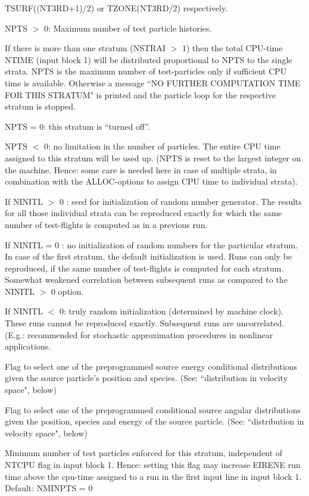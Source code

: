 \begin{list}{ }{}
TSURF((NT3RD+1)/2) or TZONE(NT3RD/2) respectively.
\item[{\bf NPTS
}] NPTS $>$ 0: Maximum number of test particle histories.

If there is more than one stratum (NSTRAI $>$  1) then the total
CPU-time NTIME (input block 1) will be distributed proportional to
NPTS to the single strata. NPTS is the maximum number of
test-particles only if sufficient CPU time is available. Otherwise
a message ``NO FURTHER COMPUTATION TIME FOR THIS STRATUM" is
printed and the particle loop for the respective stratum is
stopped.

NPTS = 0: this stratum is ``turned off''.

NPTS $<$ 0: no limitation in the number of particles. The entire
CPU time assigned to this stratum will be used up. (NPTS is reset
to the largest integer on the machine. Hence: some care is needed
here in case of multiple strata, in combination with the
ALLOC-options to assign CPU time to individual strata).


\item[{\bf NINITL }]
If NINITL $>$ 0 : seed for initialization of random number
generator. The results for all those individual strata can be
reproduced exactly for which the same number of test-flights is
computed as in a previous run.


If NINITL = 0 : no initialization of random numbers for the
particular stratum. In case of the first stratum, the default
initialization is used. Runs can only be reproduced, if the same
number of test-flights is computed for each stratum. Somewhat
weakened correlation between subsequent runs as compared to the
NINITL $>$ 0 option.

If NINITL $<$ 0: truly random initialization (determined by machine
clock). These runs cannot be reproduced exactly. Subsequent runs are
uncorrelated. (E.g.: recommended for stochastic approximation
procedures in nonlinear applications.
\item[{\bf NEMODS }]
Flag to select one of the preprogrammed
source energy conditional distributions
given the source particle's position and
species.
(See: ``distribution in velocity space", below)
\item[{\bf NAMODS }]
Flag to select one of the preprogrammed conditional
source angular distributions given the position,
species and energy of the source particle.
(See: ``distribution in velocity space", below)

\item[{\bf NMINPTS }]
Minimum number of test particles enforced for this stratum, independent of NTCPU
flag in input block 1.  Hence: setting this flag may increase EIRENE run time above the cpu-time
assigned to a run in the first input line in input block 1.
Default: NMINPTS = 0


\end{list}
